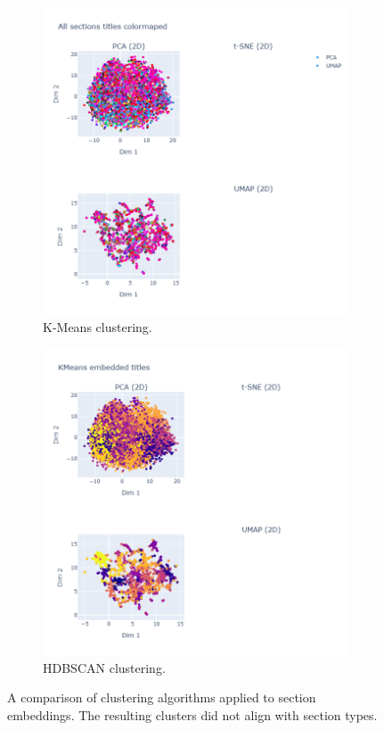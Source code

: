 \begin{figure}
    \centering
    \begin{subfigure}[b]{0.46\textwidth}
        \centering
        \includegraphics[width=\textwidth]{media/image4.png}
        \caption{K-Means clustering.}
        \label{fig:kmeans_cluster}
    \end{subfigure}
    \hfill
    \begin{subfigure}[b]{0.46\textwidth}
        \centering
        \includegraphics[width=\textwidth]{media/image5.png}
        \caption{HDBSCAN clustering.}
        \label{fig:hdbscan_cluster}
    \end{subfigure}
    \caption{A comparison of clustering algorithms applied to section embeddings. The resulting clusters did not align with section types.}
    \label{fig:clustering_comparison}
\end{figure}

